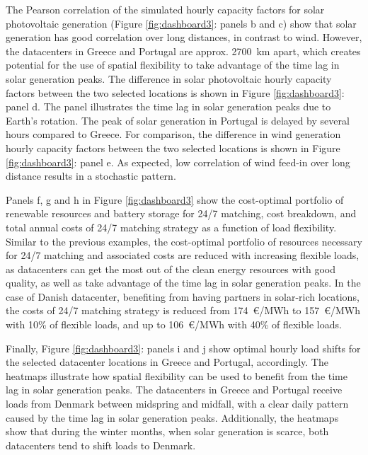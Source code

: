 The Pearson correlation of the simulated hourly capacity factors for solar photovoltaic generation (Figure \ref{fig:dashboard3}: panels b and c) show that solar generation has good correlation over long distances, in contrast to wind. However, the datacenters in Greece and Portugal are approx. 2700~km apart, which creates potential for the use of spatial flexibility to take advantage of the time lag in solar generation peaks. The difference in solar photovoltaic hourly capacity factors between the two selected locations is shown in Figure \ref{fig:dashboard3}: panel d. The panel illustrates the time lag in solar generation peaks due to Earth's rotation. The peak of solar generation in Portugal is delayed by several hours compared to Greece. For comparison, the difference in wind generation hourly capacity factors between the two selected locations is shown in Figure \ref{fig:dashboard3}: panel e. As expected, low correlation of wind feed-in over long distance results in a stochastic pattern.

Panels f, g and h in Figure \ref{fig:dashboard3} show the cost-optimal portfolio of renewable resources and battery storage for 24/7 matching, cost breakdown, and total annual costs of 24/7 matching strategy as a function of load flexibility. Similar to the previous examples, the cost-optimal portfolio of resources necessary for 24/7 matching and associated costs are reduced with increasing flexible loads, as datacenters can get the most out of the clean energy resources with good quality, as well as take advantage of the time lag in solar generation peaks. In the case of Danish datacenter, benefiting from having partners in solar-rich locations, the costs of 24/7 matching strategy is reduced from 174~\euro/MWh to 157~\euro/MWh with 10\% of flexible loads, and up to 106~\euro/MWh with 40\% of flexible loads.

Finally, Figure \ref{fig:dashboard3}: panels i and j show optimal hourly load shifts for the selected datacenter locations in Greece and Portugal, accordingly. The heatmaps illustrate how spatial flexibility can be used to benefit from the time lag in solar generation peaks. The datacenters in Greece and Portugal receive loads from Denmark between midspring and midfall, with a clear daily pattern caused by the time lag in solar generation peaks. Additionally, the heatmaps show that during the winter months, when solar generation is scarce, both datacenters tend to shift loads to Denmark.

